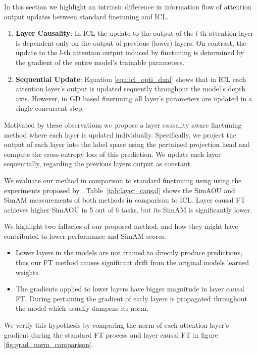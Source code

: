 In this section we highlight an intrinsic difference in information flow of attention output updates between standard finetuning and ICL.

\begin{enumerate}
	\item \textbf{Layer Causality}: In ICL the update to the output of the $l$-th attention layer is dependent only on the output of previous (lower) layers.
  On contrast, the update to the $l$-th attention output induced by finetuning is determined by the gradient of the entire model's trainable parameters.
	
  \item \textbf{Sequential Update}: Equation \ref{equ:icl_opti_dual} shows that in ICL each attention layer's output is updated sequently throughout the model's depth axis.
  However, in GD based finetuning all layer's parameters are updated in a single concurrent step.
\end{enumerate}

Motivated by these observations we propose a layer causality aware finetuning method where each layer is updated individually.
Specifically, we project the output of each layer into the label space using the pertained projection head and compute the cross-entropy loss of this prediction.
We update each layer sequentially, regarding the previous layers output as constant.  

We evaluate our method in comparison to standard finetuning using using the experiments proposed by \cite{dai2023gpt}.
Table~\ref{tab:layer_causal} shows the SimAOU and SimAM measurements of both methods in comparison to ICL.
Layer causal FT achieves higher SimAOU in 5 out of 6 tasks, but its SimAM is significantly lower.

We highlight two fallacies of our proposed method, and how they might have contributed to lower performance and SimAM scores.
\begin{itemize}
	\item Lower layers in the models are not trained to directly produce predictions, thus our FT method causes significant drift from the original models learned weights.
	\item The gradients applied to lower layers have bigger magnitude in layer causal FT.
				During pertaining the gradient of early layers is propagated throughout the model which usually dampens its norm.  
\end{itemize}

We verify this hypothesis by comparing the norm of  each attention layer's gradient during the standard FT process and layer causal FT in figure \ref{fig:grad_norm_comparison}.

